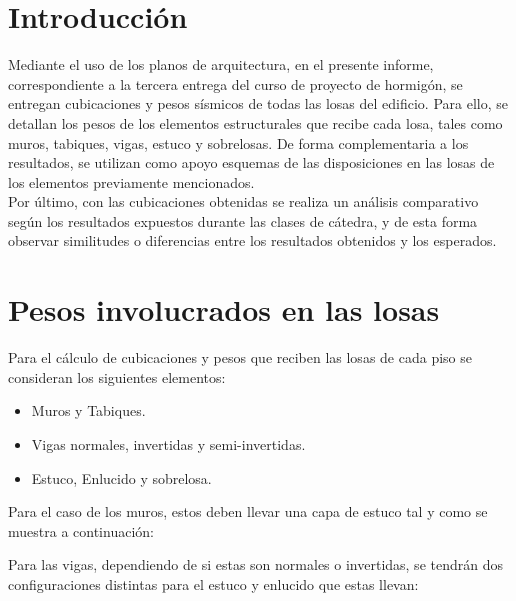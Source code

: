\documentclass[letterpaper,11pt]{article} %
\begin{document}






\section{Introducción}
Mediante el uso de los planos de arquitectura, en el presente informe, correspondiente a la tercera entrega del curso de proyecto de hormigón, se entregan cubicaciones y pesos sísmicos de todas las losas del edificio. Para ello, se detallan los pesos de los elementos estructurales que recibe cada losa, tales como muros, tabiques, vigas, estuco y sobrelosas. De forma complementaria a los resultados, se utilizan como apoyo esquemas de las disposiciones en las losas de los elementos previamente mencionados.\\

Por último, con las cubicaciones obtenidas se realiza un análisis comparativo según los resultados expuestos durante las clases de cátedra, y de esta forma observar similitudes o diferencias entre los resultados obtenidos y los esperados. 

\newpage
\section{Pesos involucrados en las losas}

Para el cálculo de cubicaciones y pesos que reciben las losas de cada piso se consideran los siguientes elementos:
\begin{itemize}
    \item Muros y Tabiques.
    \item Vigas normales, invertidas y semi-invertidas.
    \item Estuco, Enlucido y sobrelosa.
\end{itemize}

Para el caso de los muros, estos deben llevar una capa de estuco tal y como se muestra a continuación:


Para las vigas, dependiendo de si estas son normales o invertidas, se tendrán dos configuraciones distintas para el estuco y enlucido que estas llevan:
\end{document}
